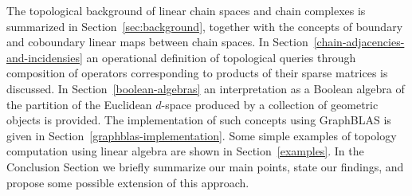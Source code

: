 The topological background of linear chain spaces and chain complexes is summarized in 
Section~\ref{sec:background}, together with the concepts of boundary and coboundary linear maps between chain spaces.
In Section~\ref{chain-adjacencies-and-incidensies} an operational definition of topological queries through composition of operators corresponding to products of their sparse matrices is discussed.
In Section~\ref{boolean-algebras} an interpretation as a Boolean algebra of the partition of the Euclidean $d$-space produced by a collection of geometric objects is provided.
The implementation of such concepts using GraphBLAS is given in Section~\ref{graphblas-implementation}. Some simple examples of topology computation using linear algebra are shown in  Section~\ref{examples}.
In the Conclusion Section we briefly summarize our main points, state our findings, and propose some possible extension of this approach.
